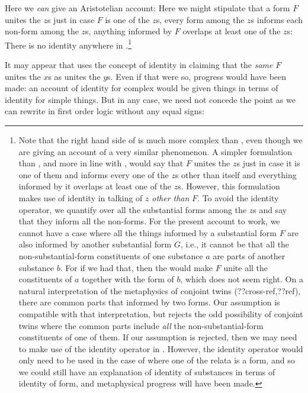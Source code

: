 Here we \textit{can} give an Aristotelian account:
Here we might stipulate that a form $F$ unites the $z$s just in case $F$ is one of 
the $z$s, every form among the $z$s informs 
each non-form among the $z$s, anything informed  by $F$ overlaps at least one of the $z$s:
There is no identity anywhere in .\footnote{Note that the right hand side of 
 is much more complex than , even though we are giving an account of a 
very similar phenomenon. A simpler formulation than , and more in line with , 
would say that $F$ unites the $z$s just in case it is one of them and informs every one of the $z$s other 
than itself and everything informed by it overlaps at least one of the $z$s. However, this formulation 
makes use of identity in talking of $z$ \textit{other than} $F$. To avoid the identity operator, we 
quantify over all the substantial forms among the $z$s and say that they inform all the non-forms. 
For the present account to work, we cannot have a case where all the things informed by a substantial
form $F$ are also informed by another substantial form $G$, i.e., it cannot be that all the non-substantial-form 
constituents of one substance $a$ are parts of another substance $b$. For if we had that, then the 
 would make $F$ unite all the constituents of $a$ together with the form of $b$, which does not
seem right. On a natural interpretation of the metaphysics of conjoint twins (??cross-ref,??ref), there are common
parts that informed by two forms. Our assumption is compatible with that interpretation, but rejects the odd
possibility of conjoint twins where the common parts include \textit{all} the non-substantial-form constituents
of one of them. If our assumption is rejected, then we may need to make use of the identity operator in .
However, the identity operator would only need to be used in the case of where one of the relata is a form, and so 
we could still have an explanation of identity of substances in terms of identity of form, and metaphysical
progress will have been made.}

It may appear that  uses the concept of identity in claiming 
that the \textit{same} $F$ unites the $x$s as unites the $y$s. Even if that were so,
progress would have been made: an account of identity for complex would be given things 
in terms of identity for simple things. But in any case, we need not concede the point
as we can rewrite  in first order logic without any equal signs:

